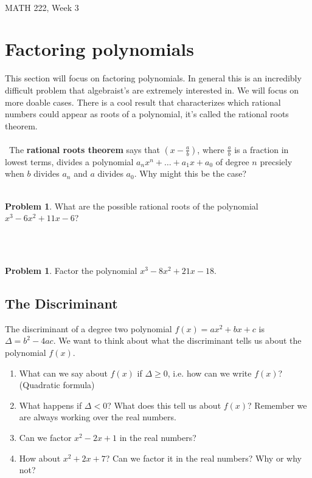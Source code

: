 \documentclass[11pt]{article}  %
\theoremstyle{definition}
\newtheorem{Prob}[Thm]{Problem}
\theoremstyle{remark}
\begin{document}
 \qquad\qquad\qquad\qquad\qquad\qquad\qquad\qquad\qquad\qquad{}\\[.2cm]
{\large MATH 222, Week 3}\newline \newline
{}
\newline
\thispagestyle{empty}  
\pagestyle{plain}
\setcounter{page}{1}

\section*{Factoring polynomials}
This section will focus on factoring polynomials. In general this is an incredibly difficult problem that algebraist's are extremely interested in. We will focus on more doable cases. There is a cool result that characterizes which rational numbers could appear as roots of a polynomial, it's called the rational roots theorem.
\ \\ \
\ \\ \
\noindent The \textbf{rational roots theorem} says that $(x-\frac ab)$, where
	$\frac ab$ is a fraction in lowest terms, divides a polynomial
	$a_nx^n+\dots+a_1x+a_0$ of degree $n$ precsiely when $b$ divides $a_n$
	and $a$ divides $a_0$. Why might this be the case?
\ \\ \
\begin{Prob}
What are the possible rational roots of the polynomial $x^3-6 x^2+11 x-6$?
\end{Prob}
\ \\ \

\begin{Prob}
Factor the polynomial $x^3-8x^2+21x-18$.
\end{Prob}

\subsection*{The Discriminant}
The discriminant of a degree two polynomial $f(x) = ax^2+bx+c$ is $\Delta = b^2 - 4ac$. We want to think about what the discriminant tells us about the polynomial $f(x)$.
\begin{enumerate}
\item What can we say about $f(x)$ if $\Delta \geq 0$, i.e. how can we write $f(x)$? (Quadratic formula)
\item What happens if $\Delta < 0$? What does this tell us about $f(x)$? Remember we are always working over the real numbers.
\item Can we factor $x^2 -2x + 1$ in the real numbers?
\item How about $x^2 +2x + 7$? Can we factor it in the real numbers? Why or why not?
\end{enumerate}
\end{document}
